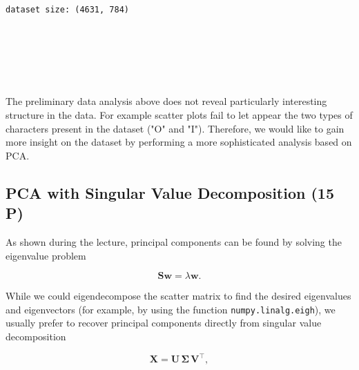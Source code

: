 \documentclass[11pt]{article}
\begin{document}
    \begin{Verbatim}[commandchars=\\\{\}]
dataset size: (4631, 784)

    \end{Verbatim}

    \begin{center}
    \end{center}
    { \hspace*{\fill} \\}
    
    \begin{center}
    \end{center}
    { \hspace*{\fill} \\}
    
    \begin{center}
    \end{center}
    { \hspace*{\fill} \\}
    
    The preliminary data analysis above does not reveal particularly
interesting structure in the data. For example scatter plots fail to let
appear the two types of characters present in the dataset ("O" and "I").
Therefore, we would like to gain more insight on the dataset by
performing a more sophisticated analysis based on PCA.

\subsection{PCA with Singular Value Decomposition (15
P)}\label{pca-with-singular-value-decomposition-15-p}

As shown during the lecture, principal components can be found by
solving the eigenvalue problem

\[
\boldsymbol{S} \boldsymbol{w} = \lambda \boldsymbol{w}.
\]

While we could eigendecompose the scatter matrix to find the desired
eigenvalues and eigenvectors (for example, by using the function
\texttt{numpy.linalg.eigh}), we usually prefer to recover principal
components directly from singular value decomposition

\[
\boldsymbol{X} = \boldsymbol{U} \, \boldsymbol{\Sigma} \, \boldsymbol{V}^\top,
\]
\end{document}

